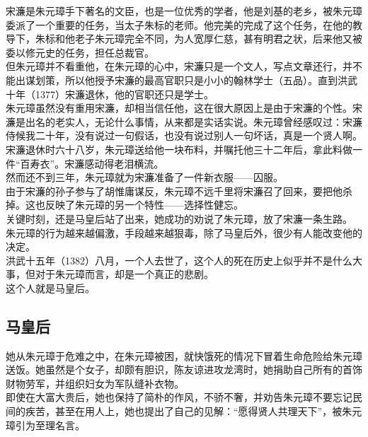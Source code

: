 \begin{multicols}{\theparacolNo}
宋濂是朱元璋手下著名的文臣，也是一位优秀的学者，他是刘基的老乡，被朱元璋委派了一个重要的任务，当太子朱标的老师。他完美的完成了这个任务，在他的教导下，朱标和他老子朱元璋完全不同，为人宽厚仁慈，甚有明君之状，后来他又被委以修元史的任务，担任总裁官。\\

但朱元璋并不看重他，在朱元璋的心中，宋濂只是一个文人，写点文章还行，并不能出谋划策，所以他授予宋濂的最高官职只是小小的翰林学士（五品）。直到洪武十年（1377）宋濂退休，他的官职还只是学士。\\

朱元璋虽然没有重用宋濂，却相当信任他，这在很大原因上是由于宋濂的个性。宋濂是出名的老实人，无论什么事情，从来都是实话实说。朱元璋曾经感叹过：宋濂侍候我二十年，没有说过一句假话，也没有说过别人一句坏话，真是一个贤人啊。\\

宋濂退休时六十八岁，朱元璋送给他一块布料，并嘱托他三十二年后，拿此料做一件“百寿衣”。宋濂感动得老泪横流。\\

然而还不到三年，朱元璋就为宋濂准备了一件新衣服——囚服。\\

由于宋濂的孙子参与了胡惟庸谋反，朱元璋不远千里将宋濂召了回来，要把他杀掉。这也反映了朱元璋的另一个特性——选择性健忘。\\

关键时刻，还是马皇后站了出来，她成功的劝说了朱元璋，放了宋濂一条生路。\\

朱元璋的行为越来越偏激，手段越来越狠毒，除了马皇后外，很少有人能改变他的决定。\\

洪武十五年（1382）八月，一个人去世了，这个人的死在历史上似乎并不是什么大事，但对于朱元璋而言，却是一个真正的悲剧。\\

这个人就是马皇后。\\

\subsection{马皇后}
她从朱元璋于危难之中，在朱元璋被困，就快饿死的情况下冒着生命危险给朱元璋送饭。她虽然是个女子，却颇有胆识，陈友谅进攻龙湾时，她捐助自己所有的首饰财物劳军，并组织妇女为军队缝补衣物。\\

即使在大富大贵后，她也保持了简朴的作风，不骄不奢，并劝告朱元璋不要忘记民间的疾苦，甚至在用人上，她也提出了自己的见解：“愿得贤人共理天下”，被朱元璋引为至理名言。\\


\end{multicols}
